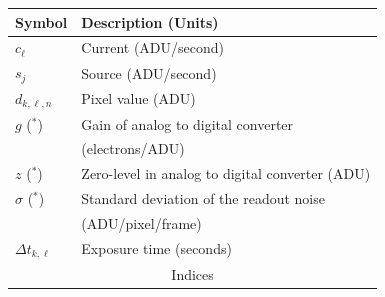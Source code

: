 \documentclass{aa}
\newcommand*{\Tag}[1]{\mathsf{#1}}
\newcommand*{\estim}[1]{\hat{#1}}
\begin{document}
\begin{table}
  \begin{tabular}{ll}
    \hline
    Symbol & Description (Units)\\
    \hline
    \hline
    $c_{\ell}$ & Current (ADU/second) \\[0.3ex]
    $s_{j}$ & Source (ADU/second) \\[0.3ex]
    $d_{k,\ell,n}$ & Pixel value (ADU) \\
    $g$ ($^\ast$) & Gain of analog to digital converter\\
      &\multicolumn{1}{l}{(electrons/ADU)} \\
    $z$ ($^\ast$) & Zero-level in analog to digital
    converter (ADU) \\
    $\sigma$ ($^\ast$)
    & Standard deviation of the readout noise\\
    & \multicolumn{1}{l}{(ADU/pixel/frame)} \\
    $\Delta t_{k,\ell}$ & Exposure time (seconds) \\
    \hline
    \multicolumn{2}{c}{Indices}\\

\end{tabular}
\end{table}
\end{document}
